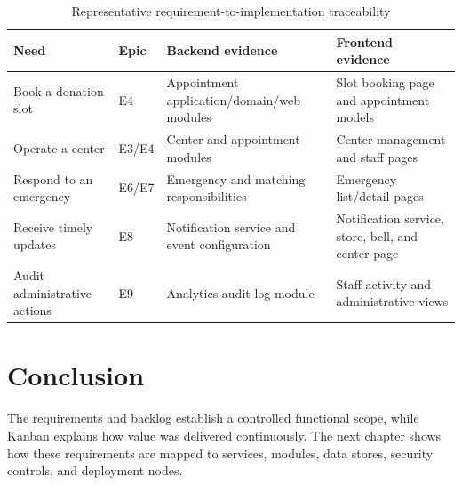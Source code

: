 \begin{table}[H]
\centering\small
\begin{tabularx}{\textwidth}{|P{3.2cm}|P{3.0cm}|Y|Y|}
\hline
{}\textbf{Need} & \textbf{Epic} & \textbf{Backend evidence} & \textbf{Frontend evidence}\\ \hline
Book a donation slot & E4 & Appointment application/domain/web modules & Slot booking page and appointment models\\ \hline
Operate a center & E3/E4 & Center and appointment modules & Center management and staff pages\\ \hline
Respond to an emergency & E6/E7 & Emergency and matching responsibilities & Emergency list/detail pages\\ \hline
Receive timely updates & E8 & Notification service and event configuration & Notification service, store, bell, and center page\\ \hline
Audit administrative actions & E9 & Analytics audit log module & Staff activity and administrative views\\ \hline
\end{tabularx}
\caption{Representative requirement-to-implementation traceability}
\label{tab:traceability}
\end{table}

\section*{Conclusion}
The requirements and backlog establish a controlled functional scope, while Kanban explains how value was delivered continuously. The next chapter shows how these requirements are mapped to services, modules, data stores, security controls, and deployment nodes.

